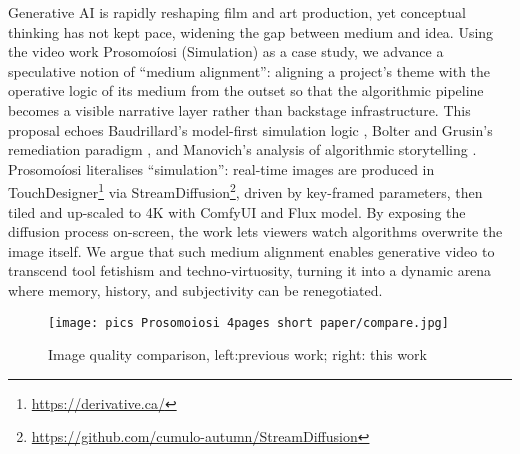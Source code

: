 \documentclass[sigconf,nonacm]{acmart}
\begin{document}
Generative AI is rapidly reshaping film and art production, yet conceptual thinking has not kept pace, widening the gap between medium and idea. Using the video work Prosomoíosi (Simulation) as a case study, we advance a speculative notion of “medium alignment”: aligning a project’s theme with the operative logic of its medium from the outset so that the algorithmic pipeline becomes a visible narrative layer rather than backstage infrastructure. This proposal echoes Baudrillard’s model-first simulation logic \cite{baudrillard_simulacra_1994}, Bolter and Grusin’s remediation paradigm \cite{bolter_remediation_1999}, and Manovich’s analysis of algorithmic storytelling \cite{manovich_language_2001}.
Prosomoíosi literalises “simulation”: real-time images are produced in TouchDesigner\footnote{\url{https://derivative.ca/}} via StreamDiffusion\footnote{\url{https://github.com/cumulo-autumn/StreamDiffusion}}, driven by key-framed parameters, then tiled and up-scaled to 4K with ComfyUI and Flux model. By exposing the diffusion process on-screen, the work lets viewers watch algorithms overwrite the image itself. We argue that such medium alignment enables generative video to transcend tool fetishism and techno-virtuosity, turning it into a dynamic arena where memory, history, and subjectivity can be renegotiated.
\begin{figure*}
    \centering
    \texttt{[image: pics Prosomoiosi 4pages short paper/compare.jpg]}
    \caption{Image quality comparison, left:previous work; right: this work}
    \label{fig:enter-label}
\end{figure*}
\end{document}
